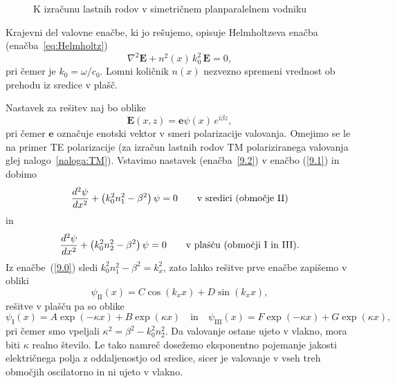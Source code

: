 \begin{figure}[ht]
\centering
\def\svgwidth{120truemm} 

\caption{K izračunu lastnih rodov v simetričnem planparalelnem vodniku}
\label{fig:vodnikracun}
\end{figure}

Krajevni del valovne enačbe, ki jo rešujemo, opisuje Helmholtzeva 
enačba (enačba~\ref{eq:Helmholtz})
\begin{equation}
\nabla^{2}\mathbf{E}+n^2(x)\,k_{0}^{2}\,\mathbf{E}=0,
\label{9.1}
\end{equation}
pri čemer je $k_{0}=\omega/c_0$. Lomni količnik $n(x)$  nezvezno spremeni vrednost ob prehodu iz sredice v plašč. 

Nastavek za rešitev naj bo oblike 
\begin{equation}
{\mathbf E}(x,z)=\mathbf{e}\psi\left(x\right)\, e^{i\beta z},
\label{9.2}
\end{equation}
pri čemer $\mathbf{e}$ označuje enotski vektor v smeri polarizacije valovanja.
Omejimo se le na primer TE polarizacije (za izračun lastnih rodov 
TM polariziranega
valovanja glej nalogo~\ref{naloga:TM}). Vstavimo nastavek (enačba~\ref{9.2}) v enačbo
(\ref{9.1}) in dobimo
\begin{equation}
\frac{d^{2}{\bf \psi}}{dx^{2}}+\left(k_{0}^{2}n_1^{2}-\beta^{2}\right){\bf \psi}=0
\qquad \textrm{v sredici (obmo\v cje II)} 
\label{9.3a}
\end{equation}
in 
\begin{equation}
\frac{d^{2}{\bf \psi}}{dx^{2}}+\left(k_{0}^{2}n_2^{2}-\beta^{2}\right){\bf \psi}=0
\qquad \textrm{v plašču (obmo\v cji I in III).} 
\label{9.3b}
\end{equation}
Iz enačbe~(\ref{9.0}) sledi $k_0^2n_1^2-\beta^2=k_x^2$, zato lahko rešitve prve enačbe
zapišemo v obliki
\begin{equation}
\psi_{\mathrm{II}}(x) = C \cos(k_x x)+D \sin(k_x x),
\end{equation}
rešitve v plašču pa so oblike
\begin{equation}
\psi_{\mathrm{I}}(x) = A \exp(-\kappa x)+B \exp(\kappa x)\quad \mathrm{in}\quad
\psi_{\mathrm{III}}(x) = F \exp(-\kappa x)+G \exp(\kappa x),
\end{equation}
pri čemer smo vpeljali $\kappa^2= \beta^2-k_0^2n_2^2$.
Da valovanje ostane ujeto v vlakno, mora biti $\kappa$ realno število.
Le tako namreč dosežemo eksponentno pojemanje jakosti električnega polja 
z oddaljenostjo od sredice,
sicer je valovanje v vseh treh območjih oscilatorno in ni ujeto v vlakno. 

